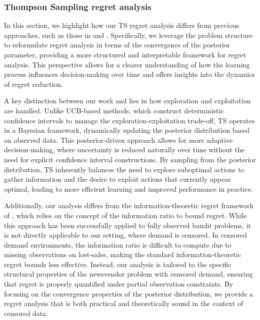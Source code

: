 \subsubsection{Thompson Sampling regret analysis}
In this section, we highlight how our TS regret analysis differs from previous approaches, such as those in \cite{russo2014learning} and \cite{russo2016information}. Specifically, we leverage the problem structure to reformulate regret analysis in terms of the convergence of the posterior parameter, providing a more structured and interpretable framework for regret analysis. This perspective allows for a clearer understanding of how the learning process influences decision-making over time and offers insights into the dynamics of regret reduction.

A key distinction between our work and \cite{russo2014learning} lies in how exploration and exploitation are handled. Unlike UCB-based methods, which construct deterministic confidence intervals to manage the exploration-exploitation trade-off, TS operates in a Bayesian framework, dynamically updating the posterior distribution based on observed data. This posterior-driven approach allows for more adaptive decision-making, where uncertainty is reduced naturally over time without the need for explicit confidence interval constructions. By sampling from the posterior distribution, TS inherently balances the need to explore suboptimal actions to gather information and the desire to exploit actions that currently appear optimal, leading to more efficient learning and improved performance in practice.

Additionally, our analysis differs from the information-theoretic regret framework of \cite{russo2016information}, which relies on the concept of the information ratio to bound regret. While this approach has been successfully applied to fully observed bandit problems, it is not directly applicable to our setting, where demand is censored. In censored demand environments, the information ratio is difficult to compute due to missing observations on lost-sales, making the standard information-theoretic regret bounds less effective. Instead, our analysis is tailored to the specific structural properties of the newsvendor problem with censored demand, ensuring that regret is properly quantified under partial observation constraints. By focusing on the convergence properties of the posterior distribution, we provide a regret analysis that is both practical and theoretically sound in the context of censored data.


